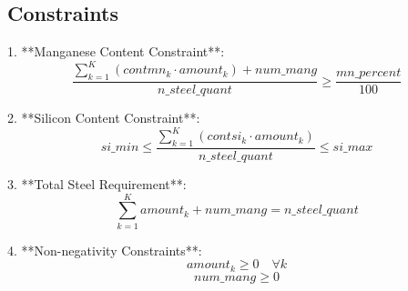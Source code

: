 \documentclass{article}
\begin{document}
\subsection*{Constraints}

1. **Manganese Content Constraint**:
   \[
   \frac{\sum_{k=1}^{K} (contmn_k \cdot amount_k) + num\_mang}{n\_steel\_quant} \geq \frac{mn\_percent}{100}
   \]

2. **Silicon Content Constraint**:
   \[
   si\_min \leq \frac{\sum_{k=1}^{K} (contsi_k \cdot amount_k)}{n\_steel\_quant} \leq si\_max
   \]

3. **Total Steel Requirement**:
   \[
   \sum_{k=1}^{K} amount_k + num\_mang = n\_steel\_quant
   \]

4. **Non-negativity Constraints**:
   \[
   amount_k \geq 0 \quad \forall k
   \]
   \[
   num\_mang \geq 0
   \]
\end{document}
